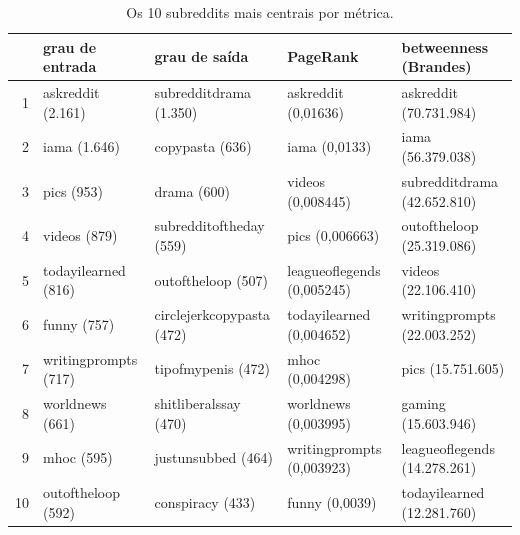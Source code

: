 \begin{table}[htbp]
\centering
\small
\caption{Os 10 subreddits mais centrais por métrica.}
\label{tab:08_hubs}
\begin{tabular}{rllll}
\toprule
 & grau de entrada & grau de saída & PageRank & betweenness (Brandes) \\
\midrule
1 & askreddit (2.161) & subredditdrama (1.350) & askreddit (0,01636) & askreddit (70.731.984) \\
2 & iama (1.646) & copypasta (636) & iama (0,0133) & iama (56.379.038) \\
3 & pics (953) & drama (600) & videos (0,008445) & subredditdrama (42.652.810) \\
4 & videos (879) & subredditoftheday (559) & pics (0,006663) & outoftheloop (25.319.086) \\
5 & todayilearned (816) & outoftheloop (507) & leagueoflegends (0,005245) & videos (22.106.410) \\
6 & funny (757) & circlejerkcopypasta (472) & todayilearned (0,004652) & writingprompts (22.003.252) \\
7 & writingprompts (717) & tipofmypenis (472) & mhoc (0,004298) & pics (15.751.605) \\
8 & worldnews (661) & shitliberalssay (470) & worldnews (0,003995) & gaming (15.603.946) \\
9 & mhoc (595) & justunsubbed (464) & writingprompts (0,003923) & leagueoflegends (14.278.261) \\
10 & outoftheloop (592) & conspiracy (433) & funny (0,0039) & todayilearned (12.281.760) \\
\bottomrule
\end{tabular}
\end{table}
